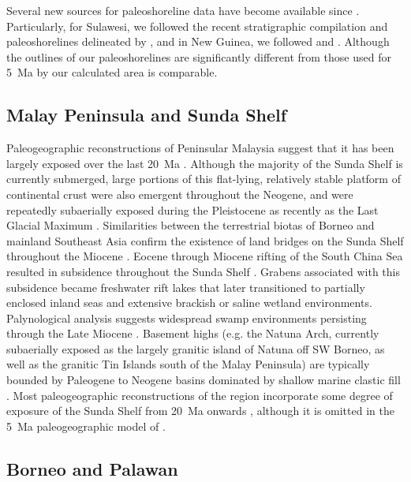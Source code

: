\documentclass[11pt,letterpaper]{article}
\begin{document}
Several new sources for paleoshoreline data have become available since \citet{Molnar2015a}. Particularly, for Sulawesi, we followed the recent stratigraphic compilation and paleoshorelines delineated by \citet{Nugraha2018a}, and in New Guinea, we followed \citet{Gold2017a} and \citet{Harrington2017a}. Although the outlines of our paleoshorelines are significantly different from those used for 5~Ma by \citet{Molnar2015a} our calculated area is comparable.

\subsection*{Malay Peninsula and Sunda Shelf}

Paleogeographic reconstructions of Peninsular Malaysia suggest that it has been largely exposed over the last 20~Ma \citep{Hall2002a, Hall2013b}. Although the majority of the Sunda Shelf is currently submerged, large portions of this flat-lying, relatively stable platform of continental crust were also emergent throughout the Neogene, and were repeatedly subaerially exposed during the Pleistocene as recently as the Last Glacial Maximum \citep{Hall2002a}. Similarities between the terrestrial biotas of Borneo and mainland Southeast Asia confirm the existence of land bridges on the Sunda Shelf throughout the Miocene \citep{Moss1998a}. Eocene through Miocene rifting of the South China Sea resulted in subsidence throughout the Sunda Shelf \citep{Morley2013a}. Grabens associated with this subsidence became freshwater rift lakes that later transitioned to partially enclosed inland seas and extensive brackish or saline wetland environments. Palynological analysis suggests widespread swamp environments persisting through the Late Miocene \citep{Morley2013a}. Basement highs (e.g. the Natuna Arch, currently subaerially exposed as the largely granitic island of Natuna off SW Borneo, as well as the granitic Tin Islands south of the Malay Peninsula) are typically bounded by Paleogene to Neogene basins dominated by shallow marine clastic fill \citep{Darmadi2007a}. Most paleogeographic reconstructions of the region incorporate some degree of exposure of the Sunda Shelf from 20~Ma onwards \citep{Hall2013b, Madon2013a}, although it is omitted in the 5~Ma paleogeographic model of \citet{Molnar2015a}.

\subsection*{Borneo and Palawan}
\end{document}
